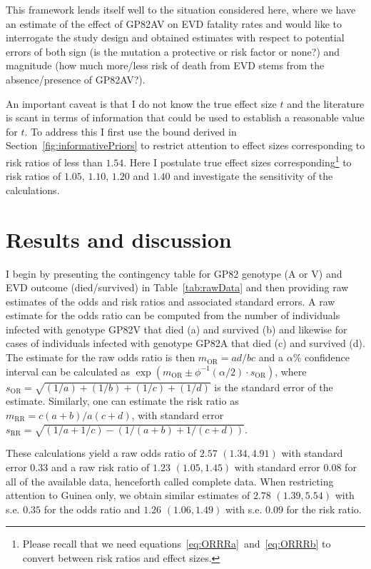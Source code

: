 This framework lends itself well to the situation considered here, where we have an estimate of the effect of GP82AV on EVD fatality rates and would like to interrogate the study design and obtained estimates with respect to potential errors of both sign (is the mutation a protective or risk factor or none?) and magnitude (how much more/less risk of death from EVD stems from the absence/presence of GP82AV?).

An important caveat is that I do not know the true effect size $t$ and the literature is scant in terms of information that could be used to establish a reasonable value for $t$.
To address this I first use the bound derived in Section~\ref{fig:informativePriors} to restrict attention to effect sizes corresponding to risk ratios of less than $1.54$.
Here I postulate true effect sizes corresponding\footnote{Please recall that we need equations~\ref{eq:ORRRa}~and~\ref{eq:ORRRb} to convert between risk ratios and effect sizes.} to risk ratios of $1.05$, $1.10$, $1.20$ and $1.40$ and investigate the sensitivity of the calculations.
 
\section{Results and discussion}
\label{sec:results-discussion}

I begin by presenting the contingency table for GP82 genotype (A or V) and EVD outcome (died/survived) in Table~\ref{tab:rawData} and then providing raw estimates of the odds and risk ratios and associated standard errors.
A raw estimate for the odds ratio can be computed from the number of individuals infected with genotype GP82V that died (a) and survived (b) and likewise for cases of individuals infected with genotype GP82A that died (c) and survived (d).
The estimate for the raw odds ratio is then $m_{\text{OR}} = ad/bc$ and a $\alpha$\% confidence interval can be calculated as $\exp(m_{\text{OR}} \pm \phi^{-1}(\alpha/2) \cdot s_{\text{OR}})$, where $s_{\text{OR}} = \sqrt{(1/a) + (1/b) + (1/c) + (1/d)}$ is the standard error of the estimate.
Similarly, one can estimate the risk ratio as $m_{\text{RR}} = c(a + b)/a(c + d)$, with standard error $s_{\text{RR}} =  \sqrt{ (1/a + 1/c) - (1/(a + b) + 1/(c + d)) }$.

These calculations yield a raw odds ratio of $2.57$ $(1.34, 4.91)$ with standard error $0.33$ and a raw risk ratio of $1.23$ $(1.05, 1.45)$ with standard error $0.08$ for all of the available data, henceforth called complete data. 
When restricting attention to Guinea only, we obtain similar estimates of $2.78$ $(1.39, 5.54)$ with s.e. $0.35$  for the odds ratio and $1.26$ $(1.06, 1.49)$ with s.e. $0.09$ for the risk ratio. 

